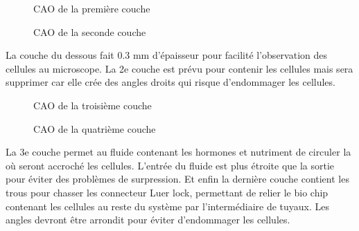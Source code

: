 \documentclass[a4paper, 11pt]{article}
\begin{document}
\newpage
\begin{multicols}{2}
    \begin{figure}[H]
        \centering
        \caption{CAO de la première couche}
        \label{fig:CAO_cellule_couche1}
    \end{figure}
    \begin{figure}[H]
        \centering
        \caption{CAO de la seconde couche}
        \label{fig:CAO_cellule_couche2}
    \end{figure}
\end{multicols}
La couche du dessous fait 0.3 mm d'épaisseur pour facilité l'observation des cellules au microscope.
La 2e couche est prévu pour contenir les cellules mais sera supprimer car elle crée des angles droits qui risque d'endommager les cellules.
\begin{multicols}{2}
    \begin{figure}[H]
        \centering
        \caption{CAO de la troisième couche}
        \label{fig:CAO_cellule_couche3}
    \end{figure}
    \begin{figure}[H]
        \centering
        \caption{CAO de la quatrième couche}
        \label{fig:CAO_cellule_couche4}
    \end{figure}
\end{multicols}
La 3e couche permet au fluide contenant les hormones et nutriment de circuler la où seront accroché les cellules.
L'entrée du fluide est plus étroite que la sortie pour éviter des problèmes de surpression.
Et enfin la dernière couche contient les trous pour chasser les connecteur Luer lock, permettant de relier le bio chip contenant les cellules au reste du système par l'intermédiaire de tuyaux.
Les angles devront être arrondit pour éviter d'endommager les cellules.
\end{document}
